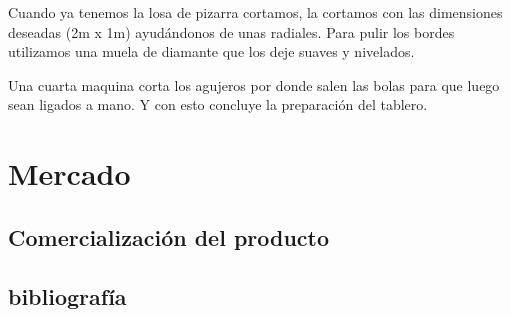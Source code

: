 Cuando ya tenemos la losa de pizarra cortamos, la cortamos con las dimensiones deseadas (2m x 1m) ayudándonos de unas radiales. Para pulir los bordes utilizamos una muela de diamante que los deje suaves y nivelados.

Una cuarta maquina corta los agujeros por donde salen las bolas para que luego sean ligados a mano. Y con esto concluye la preparación del tablero.
 

  	


\section {Mercado}

	\subsection {Comercialización del producto}


\subsection{bibliografía}




